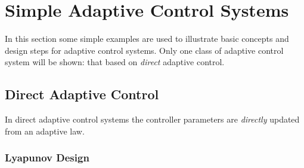\documentclass[11pt,a4paper,oneside]{book}
\numberwithin{equation}{section}
\theoremstyle{it}
\theoremstyle{definition}
\begin{document}
\section{Simple Adaptive Control Systems} 
In this section some simple examples are used to illustrate basic concepts and design steps for adaptive control systems. Only one class of adaptive control system will be shown: that based on \textit{direct} adaptive control.
\subsection{Direct Adaptive Control} 
In direct adaptive control systems the controller parameters are \textit{directly} updated from an adaptive law. 
\subsubsection{Lyapunov Design} 
\end{document}
